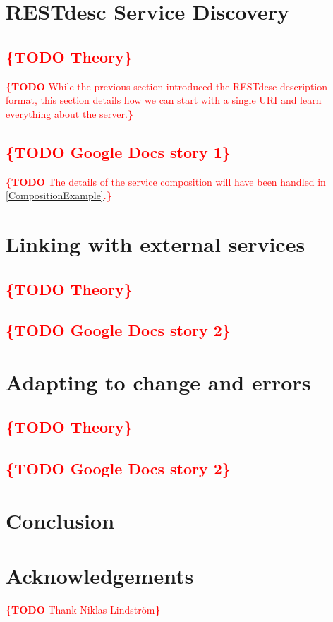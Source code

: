 \documentclass[runningheads,a4paper, twocolumn]{llncs}
\newcommand{\todo}[1]{\noindent\textcolor{red}{{\bf \{TODO} #1{\bf \}}}}
\begin{document}
\clearpage


\section{RESTdesc Service Discovery}
\subsection{\todo{Theory}}
\todo{While the previous section introduced the RESTdesc description format, this section details how we can start with a single URI and learn everything about the server.}

\subsection{\todo{Google Docs story 1}}
\todo{The details of the service composition will have been handled in \ref{CompositionExample}.}


\section{Linking with external services}
\subsection{\todo{Theory}}
\subsection{\todo{Google Docs story 2}}


\section{Adapting to change and errors}
\subsection{\todo{Theory}}
\subsection{\todo{Google Docs story 2}}


\section{Conclusion}


\section*{Acknowledgements}
\todo{Thank Niklas Lindstr\"om}

\renewcommand{\ttdefault}{cmvtt}



\end{document}
